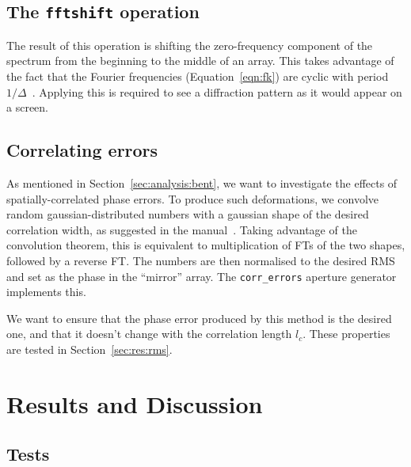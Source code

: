 \documentclass{article}
\begin{document}
\subsection{The \texttt{fftshift} operation}
The result of this operation is shifting the zero-frequency component of the spectrum from the beginning to the middle of an array. This takes advantage of the fact that the Fourier frequencies (Equation~\ref{eqn:fk}) are cyclic with period $1/\Delta$~\cite[Section~12.1.2]{NumRecipes}. Applying this is required to see a diffraction pattern as it would appear on a screen.

\subsection{Correlating errors}
As mentioned in Section~\ref{sec:analysis:bent}, we want to investigate the effects of spatially-correlated phase errors. To produce such deformations, we convolve random gaussian-distributed numbers with a gaussian shape of the desired correlation width, as suggested in the manual~\cite{manual}. Taking advantage of the convolution theorem, this is equivalent to multiplication of FTs of the two shapes, followed by a reverse FT. The numbers are then normalised to the desired RMS and set as the phase in the ``mirror'' array. The \texttt{corr\_errors} aperture generator implements this.

We want to ensure that the phase error produced by this method is the desired one, and that it doesn't change with the correlation length $l_c$. These properties are tested in Section~\ref{sec:res:rms}.

\section{Results and Discussion}\label{sec:res}
\subsection{Tests}
\end{document}
